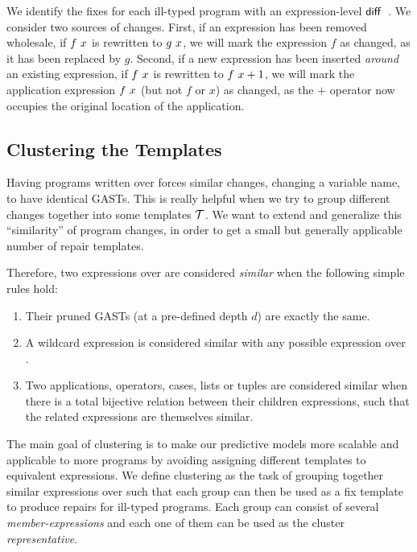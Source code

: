 We identify the fixes for each ill-typed program with an expression-level
$\mathsf{diff}$~\citep{Lempsink2009-xf}. We consider two sources of changes. First,
if an expression has been removed wholesale, \eg if $f\ x$ is rewritten
to $g\ x$, we will mark the expression $f$ as changed, as it has been
replaced by $g$. Second, if a new expression has been inserted \emph{around} an
existing expression, \eg if $f\ x$ is rewritten to
$f\ x + 1$, we will mark the application expression $f\ x$
(but not $f$ or $x$) as changed, as the $+$ operator now occupies the original
location of the application.



\subsection{Clustering the Templates}
\label{subsec:clustering}

Having programs written over \repairLang forces similar changes, \ie changing a
variable name, to have identical GASTs. This is really helpful when we try to
group different changes together into some templates $\mathcal{T}$. We want to extend and
generalize this ``similarity'' of program changes, in order to get a small but
generally applicable number of repair templates.

Therefore, two expressions over \repairLang are considered \emph{similar} when
the following simple rules hold:
\begin{enumerate}
    \item Their pruned GASTs (at a pre-defined depth $d$) are exactly the same.
    \item A wildcard expression is considered similar with any possible
    expression over \repairLang.
    \item Two applications, operators, cases, lists or tuples are considered
    similar when there is a total bijective relation between their children
    expressions, such that the related expressions are themselves similar.
\end{enumerate}


The main goal of clustering is to make our predictive models more scalable
and applicable to more programs by avoiding assigning different templates
to equivalent expressions. We define
clustering as the task of grouping together similar expressions over \repairLang
such that each group can then be used as a fix template to produce repairs for
ill-typed programs. Each group can consist of several \emph{member-expressions}
and each one of them can be used as the cluster \emph{representative}.

